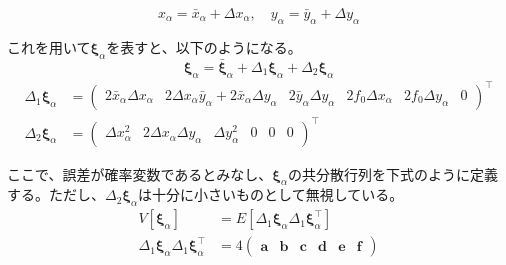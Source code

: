 \documentclass[12pt,a4j]{jsarticle}
\newcommand{\xa}{x_\alpha}
\newcommand{\bxa}{\bar{x}_\alpha}
\newcommand{\dxa}{\Delta x_\alpha}
\newcommand{\ya}{y_\alpha}
\newcommand{\bya}{\bar{y}_\alpha}
\newcommand{\dya}{\Delta y_\alpha}
\newcommand{\xia}{\bm{\xi}_\alpha}
\newcommand{\bxia}{\bar{\bm{\xi}}_\alpha}
\begin{document}
      \begin{equation}
        \xa = \bxa + \dxa, \quad \ya = \bya + \dya
      \end{equation}

      これを用いて$\xia$を表すと、以下のようになる。
      \begin{equation}
        \xia = \bxia + \Delta_1\xia + \Delta_2\xia
      \end{equation}
      \begin{align}
        \Delta_1\xia &= \begin{pmatrix}2\bxa\dxa & 2\dxa\bya + 2\bxa\dya & 2\bya\dya & 2f_0\dxa & 2f_0\dya & 0\end{pmatrix}^\top \\
        \Delta_2\xia &= \begin{pmatrix}\dxa^2 & 2\dxa\dya & \dya^2 & 0 & 0 & 0 \end{pmatrix}^\top
      \end{align}

      ここで、誤差が確率変数であるとみなし、$\xia$の共分散行列を下式のように定義する。ただし、$\Delta_2\xia$は十分に小さいものとして無視している。
      \begin{align}
        V[\xia] &= E[\Delta_1\xia\Delta_1\xia^\top] \\
        \Delta_1\xia\Delta_1\xia^\top &= 4\begin{pmatrix}
          \bm{a} & \bm{b} & \bm{c} & \bm{d} & \bm{e} & \bm{f}
        \end{pmatrix}
      \end{align}
\end{document}
